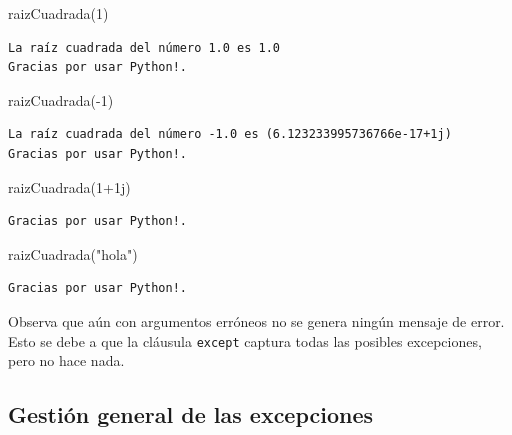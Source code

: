 \documentclass[
  spanish,
  letterpaper,
]{scrbook}
\newenvironment{Shaded}{\begin{snugshade}}{\end{snugshade}}
\newcommand{\DecValTok}[1]{\textcolor[rgb]{0.68,0.00,0.00}{#1}}
\newcommand{\NormalTok}[1]{\textcolor[rgb]{0.00,0.23,0.31}{#1}}
\newcommand{\OperatorTok}[1]{\textcolor[rgb]{0.37,0.37,0.37}{#1}}
\newcommand{\OtherTok}[1]{\textcolor[rgb]{0.00,0.23,0.31}{#1}}
\newcommand{\StringTok}[1]{\textcolor[rgb]{0.13,0.47,0.30}{#1}}
\theoremstyle{definition}
\theoremstyle{remark}
\begin{document}
\begin{Shaded}
\begin{Highlighting}[]
\NormalTok{raizCuadrada(}\DecValTok{1}\NormalTok{)}
\end{Highlighting}
\end{Shaded}

\begin{verbatim}
La raíz cuadrada del número 1.0 es 1.0
Gracias por usar Python!.
\end{verbatim}

\begin{Shaded}
\begin{Highlighting}[]
\NormalTok{raizCuadrada(}\OperatorTok{{-}}\DecValTok{1}\NormalTok{)}
\end{Highlighting}
\end{Shaded}

\begin{verbatim}
La raíz cuadrada del número -1.0 es (6.123233995736766e-17+1j)
Gracias por usar Python!.
\end{verbatim}

\begin{Shaded}
\begin{Highlighting}[]
\NormalTok{raizCuadrada(}\DecValTok{1}\OperatorTok{+}\OtherTok{1j}\NormalTok{)}
\end{Highlighting}
\end{Shaded}

\begin{verbatim}
Gracias por usar Python!.
\end{verbatim}

\begin{Shaded}
\begin{Highlighting}[]
\NormalTok{raizCuadrada(}\StringTok{"hola"}\NormalTok{)}
\end{Highlighting}
\end{Shaded}

\begin{verbatim}
Gracias por usar Python!.
\end{verbatim}

Observa que aún con argumentos erróneos no se genera ningún mensaje de
error. Esto se debe a que la cláusula \texttt{except} captura todas las
posibles excepciones, pero no hace nada.

\subsection{Gestión general de las
excepciones}\label{gestiuxf3n-general-de-las-excepciones}
\end{document}
